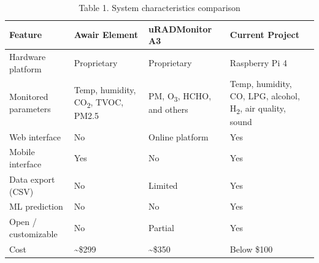 \begin{table}[H]
  \centering
  \caption{Table 1. System characteristics comparison}
  \label{tab:comparison}
  \renewcommand{\arraystretch}{1.3}
  \begin{tabularx}{\textwidth}{|l|X|X|X|}
    \hline
    \textbf{Feature} & \textbf{Awair Element} & \textbf{uRADMonitor A3} & \textbf{Current Project} \\
    \hline
    Hardware platform
      & Proprietary
      & Proprietary
      & Raspberry Pi 4 \\
    \hline
    Monitored parameters
      & Temp, humidity, CO\textsubscript{2}, TVOC, PM2.5
      & PM, O\textsubscript{3}, HCHO, and others
      & Temp, humidity, CO, LPG, alcohol, H\textsubscript{2}, air quality, sound \\
    \hline
    Web interface    & No  & Online platform & Yes \\
    \hline
    Mobile interface & Yes & No  & Yes \\
    \hline
    Data export (CSV)& No  & Limited & Yes \\
    \hline
    ML prediction    & No  & No  & Yes \\
    \hline
    Open / customizable & No & Partial & Yes \\
    \hline
    Cost & \textasciitilde\$299 & \textasciitilde\$350 & Below \$100 \\
    \hline
  \end{tabularx}
\end{table}
